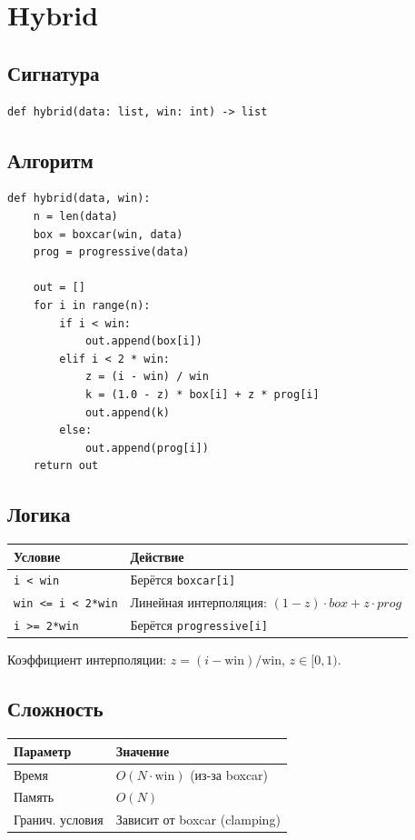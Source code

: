 \documentclass[12pt,a4paper]{article}
\begin{document}
\section{Hybrid}

\subsection{Сигнатура}

\begin{lstlisting}
def hybrid(data: list, win: int) -> list
\end{lstlisting}

\subsection{Алгоритм}

\begin{lstlisting}
def hybrid(data, win):
    n = len(data)
    box = boxcar(win, data)
    prog = progressive(data)

    out = []
    for i in range(n):
        if i < win:
            out.append(box[i])
        elif i < 2 * win:
            z = (i - win) / win
            k = (1.0 - z) * box[i] + z * prog[i]
            out.append(k)
        else:
            out.append(prog[i])
    return out
\end{lstlisting}

\subsection{Логика}

\begin{center}
\begin{tabular}{|l|l|}
\hline
\textbf{Условие} & \textbf{Действие} \\
\hline
\texttt{i < win}           & Берётся \texttt{boxcar[i]} \\
\texttt{win <= i < 2*win}  & Линейная интерполяция: $(1{-}z) \cdot box + z \cdot prog$ \\
\texttt{i >= 2*win}        & Берётся \texttt{progressive[i]} \\
\hline
\end{tabular}
\end{center}

Коэффициент интерполяции: $z = (i - \text{win}) / \text{win}$, $z \in [0, 1)$.

\subsection{Сложность}

\begin{center}
\begin{tabular}{|l|l|}
\hline
\textbf{Параметр} & \textbf{Значение} \\
\hline
Время            & $O(N \cdot \text{win})$ (из-за boxcar) \\
Память           & $O(N)$ \\
Гранич. условия  & Зависит от boxcar (clamping) \\
\hline
\end{tabular}
\end{center}
\end{document}
